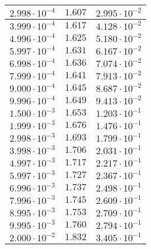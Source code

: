 \begin{tabular}{|c|c|c|}
    \(2.998\cdot10^{-4}\)	& \(1.607\)	& \(2.995\cdot10^{-2}\)	 	\\ \hline
    \(3.999\cdot10^{-4}\)	& \(1.617\)	& \(4.128\cdot10^{-2}\)	 	\\ \hline
    \(4.996\cdot10^{-4}\)	& \(1.625\)	& \(5.180\cdot10^{-2}\)	 	\\ \hline
    \(5.997\cdot10^{-4}\)	& \(1.631\)	& \(6.167\cdot10^{-2}\)	 	\\ \hline
    \(6.998\cdot10^{-4}\)	& \(1.636\)	& \(7.074\cdot10^{-2}\)	 	\\ \hline
    \(7.999\cdot10^{-4}\)	& \(1.641\)	& \(7.913\cdot10^{-2}\)	 	\\ \hline
    \(9.000\cdot10^{-4}\)	& \(1.645\)	& \(8.687\cdot10^{-2}\)	 	\\ \hline
    \(9.996\cdot10^{-4}\)	& \(1.649\)	& \(9.413\cdot10^{-2}\)	 	\\ \hline
    \(1.500\cdot10^{-3}\)	& \(1.653\)	& \(1.203\cdot10^{-1}\)	 	\\ \hline
    \(1.999\cdot10^{-3}\)	& \(1.676\)	& \(1.476\cdot10^{-1}\)	 	\\ \hline
    \(2.998\cdot10^{-3}\)	& \(1.693\)	& \(1.799\cdot10^{-1}\)	 	\\ \hline
    \(3.998\cdot10^{-3}\)	& \(1.706\)	& \(2.031\cdot10^{-1}\)	 	\\ \hline
    \(4.997\cdot10^{-3}\)	& \(1.717\)	& \(2.217\cdot10^{-1}\)	 	\\ \hline
    \(5.997\cdot10^{-3}\)	& \(1.727\)	& \(2.367\cdot10^{-1}\)	 	\\ \hline
    \(6.996\cdot10^{-3}\)	& \(1.737\)	& \(2.498\cdot10^{-1}\)	 	\\ \hline
    \(7.996\cdot10^{-3}\)	& \(1.745\)	& \(2.609\cdot10^{-1}\)	 	\\ \hline
    \(8.995\cdot10^{-3}\)	& \(1.753\)	& \(2.709\cdot10^{-1}\)	 	\\ \hline
    \(9.995\cdot10^{-3}\)	& \(1.760\)	& \(2.794\cdot10^{-1}\)	 	\\ \hline
    \(2.000\cdot10^{-2}\)	& \(1.832\)	& \(3.405\cdot10^{-1}\)	 	\\ \hline
\end{tabular}